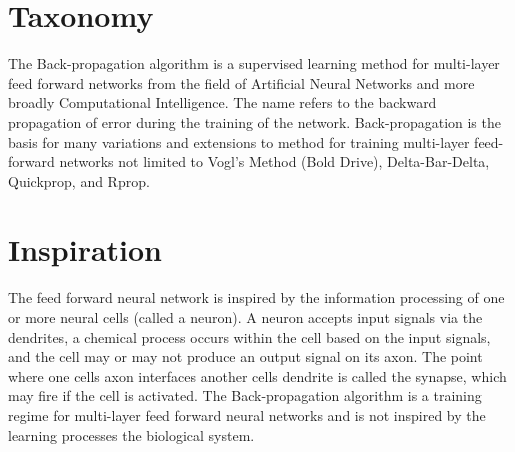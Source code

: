 \documentclass[a4paper, 11pt]{article}
\begin{document}
\section{Taxonomy}
\label{sec:taxonomy}
The Back-propagation algorithm is a supervised learning method for multi-layer feed forward networks from the field of Artificial Neural Networks and more broadly Computational Intelligence.
The name refers to the backward propagation of error during the training of the network. Back-propagation is the basis for many variations and extensions to method for training multi-layer feed-forward networks not limited to Vogl's Method (Bold Drive), Delta-Bar-Delta, Quickprop, and Rprop.

\section{Inspiration}
\label{sec:inspiration}
The feed forward neural network is inspired by the information processing of one or more neural cells (called a neuron). 
A neuron accepts input signals via the dendrites, a chemical process occurs within the cell based on the input signals, and the cell may or may not produce an output signal on its axon. The point where one cells axon interfaces another cells dendrite is called the synapse, which may fire if the cell is activated.
The Back-propagation algorithm is a training regime for multi-layer feed forward neural networks and is not inspired by the learning processes the biological system.
\end{document}
